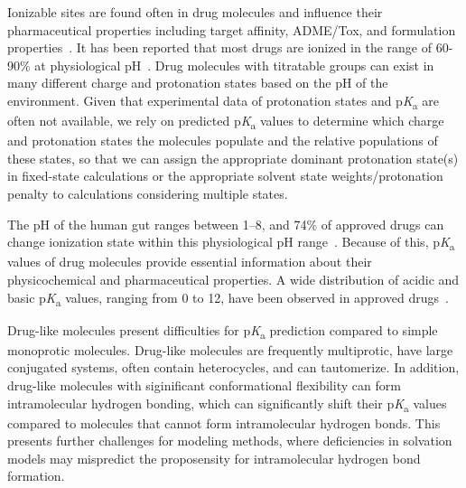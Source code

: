 \documentclass[9pt,lineno,final]{elife}
\newcommand{\pKa}{p\textit{K}\textsubscript{a}}
\begin{document}
Ionizable sites are found often in drug molecules and influence their pharmaceutical properties including target affinity, ADME/Tox, and formulation properties~\citep{Manallack:2013:ChemSocRev}. It has been reported that most drugs are ionized in the range of 60-90\% at physiological pH~\citep{Charifson:2014:J.Med.Chem.}.
Drug molecules with titratable groups can exist in many different charge and protonation states based on the pH of the environment. 
Given that experimental data of protonation states and \pKa{} are often not available, we rely on predicted \pKa{} values to determine which charge and protonation states the molecules populate and the relative populations of these states, so that we can assign the appropriate dominant protonation state(s) in fixed-state calculations or the appropriate solvent state weights/protonation penalty to calculations considering multiple states.

The pH of the human gut ranges between 1--8, and 74\% of approved drugs can change ionization state within this physiological pH range~\citep{Manallack:2013:ChemMedChema}. 
Because of this, \pKa{} values of drug molecules provide essential information about their physicochemical and pharmaceutical properties. 
A wide distribution of acidic and basic \pKa{} values, ranging from 0 to 12, have been observed in approved drugs~\citep{Manallack:2013:ChemMedChema, Manallack:2013:ChemSocRev}.

Drug-like molecules present difficulties for \pKa{} prediction compared to simple monoprotic molecules. 
Drug-like molecules are frequently multiprotic, have large conjugated systems, often contain heterocycles, and can tautomerize. 
In addition, drug-like molecules with siginificant conformational flexibility can form intramolecular hydrogen bonding, which can significantly shift their \pKa{} values compared to molecules that cannot form intramolecular hydrogen bonds. 
This presents further challenges for modeling methods, where deficiencies in solvation models may mispredict the proposensity for intramolecular hydrogen bond formation. 
\end{document}
